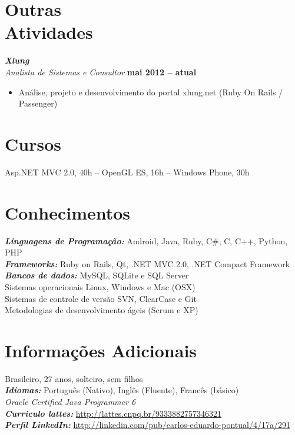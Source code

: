 \documentclass[margin, 10pt]{res} %
\begin{document}
\begin{resume}

\section{Outras \\ Atividades}

{\sl\bf Xlung} \\
{\sl Analista de Sistemas e Consultor} \hfill {\bf mai 2012 -- atual}
\begin{itemize} \itemsep -2pt 
\item Análise, projeto e desenvolvimento do portal xlung.net (Ruby On Rails / Passenger)
\end{itemize} 

\section{Cursos}
Asp.NET MVC 2.0, 40h -- OpenGL ES, 16h -- Windows Phone, 30h


\section{Conhecimentos}
{\sl\bf Linguagens de Programação:}  Android, Java, Ruby, C\#, C, C++, Python, PHP \\
{\sl\bf Frameworks:} Ruby on Rails, Qt, .NET MVC 2.0, .NET Compact Framework \\
{\sl\bf Bancos de dados:} MySQL, SQLite e SQL Server \\
Sistemas operacionais Linux, Windows e Mac (OSX) \\
Sistemas de controle de versão SVN, ClearCase e Git \\
Metodologias de desenvolvimento ágeis (Scrum e XP)  \\

\section {Informações Adicionais}
Brasileiro, 27 anos, solteiro, sem filhos \\
{\sl\bf Idiomas:} Português (Nativo), Inglês (Fluente), Francês (básico) \\
{\sl Oracle Certified Java Programmer 6} \\
{\sl\bf Curriculo lattes:} \url{http://lattes.cnpq.br/9333882757346321} \\
{\sl\bf Perfil LinkedIn:} \url{http://linkedin.com/pub/carlos-eduardo-pontual/4/17a/291} \\


\end{resume}
\end{document}
